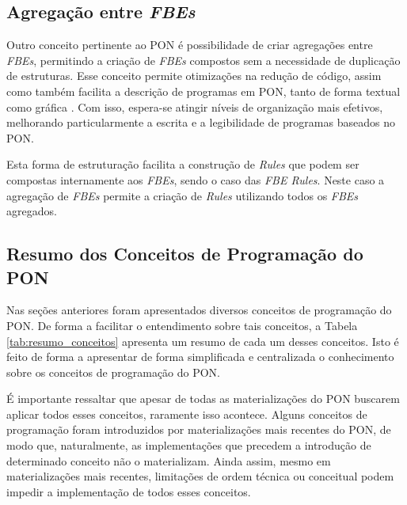 \subsection{Agregação entre \textit{FBEs}}\label{sec:agregacao}

Outro conceito pertinente ao PON é possibilidade de criar agregações entre
\textit{FBEs}, permitindo a criação de \textit{FBEs} compostos sem a necessidade
de duplicação de estruturas. Esse conceito permite otimizações na redução de
código, assim como também facilita a descrição de programas em PON, tanto de
forma textual como gráfica \cite{doc_ronszcka_2019}. Com isso, espera-se atingir
níveis de organização mais efetivos, melhorando particularmente a escrita e a
legibilidade de programas baseados no PON.

Esta forma de estruturação facilita a construção de \textit{Rules} que podem ser
compostas internamente aos \textit{FBEs}, sendo o caso das \textit{FBE Rules}.
Neste caso a agregação de \textit{FBEs} permite a criação de \textit{Rules}
utilizando todos os \textit{FBEs} agregados. 


\subsection{Resumo dos Conceitos de Programação do PON}

Nas seções anteriores foram apresentados diversos conceitos de programação do
PON. De forma a facilitar o entendimento sobre tais conceitos, a Tabela
\ref{tab:resumo_conceitos} apresenta um resumo de cada um desses conceitos.
Isto é feito de forma a apresentar de forma simplificada e centralizada o
conhecimento sobre os conceitos de programação do PON.

É importante ressaltar que apesar de todas as materializações do PON buscarem
aplicar todos esses conceitos, raramente isso acontece. Alguns conceitos de
programação foram introduzidos por materializações mais recentes do PON, de modo
que, naturalmente, as implementações que precedem a introdução de determinado
conceito não o materializam. Ainda assim, mesmo em materializações mais recentes,
limitações de ordem técnica ou conceitual podem impedir a implementação de todos
esses conceitos.

